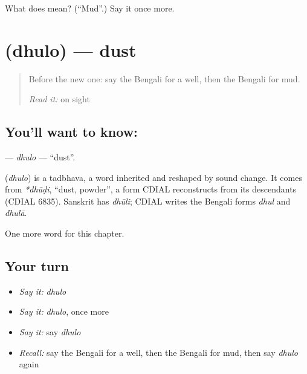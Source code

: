 \begin{tcolorbox}[breakable,colback=teal!4,colframe=teal!35!black,title={Before you move on}]
What does  mean? (\textquotedblleft{}Mud\textquotedblright{}.) Say it once more.
\end{tcolorbox}
\section[\texorpdfstring{\bn{ধুলো} (dhulo)}{ধুলো (dhulo)}]{ (dhulo) — dust}

\label{lesson:BN-C113-dhulo}



\begin{quote}
Before the new one: say the Bengali for a well, then the Bengali for mud.

\emph{Read it:} \textbf{  } on sight
\end{quote}

\subsection*{You'll want to know: }
\textbf{} — \emph{dhulo} — \textquotedblleft{}dust\textquotedblright{}.

\begin{cousinweb}
\textbf{} (\emph{dhulo}) is a tadbhava, a word inherited and reshaped by sound change. It comes from \emph{*dhūḍi}, \textquotedblleft{}dust, powder\textquotedblright{}, a form CDIAL reconstructs from its descendants (CDIAL 6835). Sanskrit has \emph{dhūli}; CDIAL writes the Bengali forms \emph{dhul} and \emph{dhulā}.
\end{cousinweb}

\begin{grammarlens}[title={What you've built}]
One more word for this chapter.
\end{grammarlens}

\subsection*{Your turn}
\begin{itemize}
\raggedright
  \item \emph{Say it:} \emph{dhulo}
  \item \emph{Say it:} \emph{dhulo}, once more
  \item \emph{Say it:} say \emph{dhulo}
  \item \emph{Recall:} say the Bengali for a well, then the Bengali for mud, then say \emph{dhulo} again
\end{itemize}

